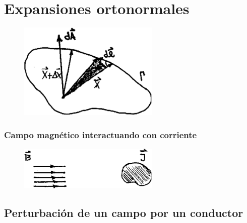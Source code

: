 \documentclass[10pt,oneside]{CBFT_book}
\begin{document}
\chapter{Expansiones ortonormales}

\begin{figure}[htb]
	\begin{center}
	\includegraphics[width=0.6\textwidth]{images/fig_ft1_mmag.pdf}	 
	\end{center}
	\caption{}
\end{figure} 

\subsection{Campo magnético interactuando con corriente}

\begin{figure}[htb]
	\begin{center}
	\includegraphics[width=0.6\textwidth]{images/fig_ft1_campocorr.pdf}	 
	\end{center}
	\caption{}
\end{figure} 

\section{Perturbación de un campo por un conductor}
\end{document}
